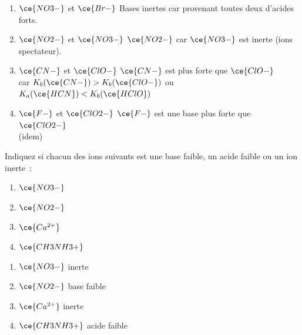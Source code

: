 \documentclass[
  11pt,
  french,
  a4paper,
  openany]{book}
\providecommand{\tightlist}{%
  \setlength{\itemsep}{0pt}\setlength{\parskip}{0pt}}
\begin{document}
\begin{Answer}

\begin{enumerate}
\def\labelenumi{\alph{enumi}.}
\tightlist
\item
  \(\ce{NO3-}\) et \(\ce{Br-}\) \tabto{8em} Bases inertes car provenant toutes deux d'acides forts.
  \vspace{1em}
\item
  \(\ce{NO2-}\) et \(\ce{NO3-}\) \tabto{8em} \(\ce{NO2-}\) car \(\ce{NO3-}\) est inerte (ions spectateur).
  \vspace{1em}
\item
  \(\ce{CN-}\) et \(\ce{ClO-}\) \tabto{8em} \(\ce{CN-}\) est plus forte que \(\ce{ClO-}\)\\
  \tabto{8em} car \(K_b(\ce{CN-}) > K_b(\ce{ClO-})\) ou \(K_a(\ce{HCN}) < K_b(\ce{HClO})\)
  \vspace{1em}
\item
  \(\ce{F-}\) et \(\ce{ClO2-}\) \tabto{8em} \(\ce{F-}\) est une base plus forte que \(\ce{ClO2-}\)\\
  \tabto{8em} (idem)
\end{enumerate}


\end{Answer}

\begin{Exercise}

Indiquez si chacun des ions suivants est une base faible, un acide faible ou un ion inerte~:

\begin{enumerate}
\def\labelenumi{\alph{enumi}.}
\tightlist
\item
  \(\ce{NO3-}\)
\item
  \(\ce{NO2-}\)
\item
  \(\ce{Ca^{2+}}\)
\item
  \(\ce{CH3NH3+}\)
\end{enumerate}


\end{Exercise}

\begin{Answer}

\begin{enumerate}
\def\labelenumi{\alph{enumi}.}
\tightlist
\item
  \(\ce{NO3-}\) \tabto{6em} inerte
  \vspace{1em}
\item
  \(\ce{NO2-}\) \tabto{6em} base faible
  \vspace{1em}
\item
  \(\ce{Ca^{2+}}\) \tabto{6em} inerte
  \vspace{1em}
\item
  \(\ce{CH3NH3+}\) \tabto{6em} acide faible
  \vspace{1em}
\end{enumerate}


\end{Answer}
\end{document}
